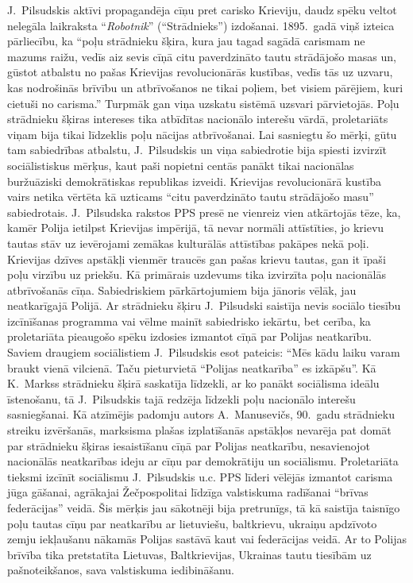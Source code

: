 \documentclass[twoside,a5paper,12pt,fleqn,openany]{extbook}
\newcommand{\pltxti}[1]{\textit{\textpolish{#1}}}
\begin{document}
J.~Pilsudskis aktīvi propagandēja cīņu pret carisko Krieviju, daudz spēku veltot nelegāla laikraksta ``\pltxti{Robotnik}'' (``Strādnieks'') izdošanai. 1895.~gadā viņš izteica pārliecību, ka ``poļu strādnieku šķira, kura jau tagad sagādā carismam ne mazums raižu, vedīs aiz sevis cīņā citu paverdzināto tautu strādājošo masas un, gūstot atbalstu no pašas Krievijas revolucionārās kustības, vedīs tās uz uzvaru, kas nodrošinās brīvību un atbrīvošanos ne tikai poļiem, bet visiem pārējiem, kuri cietuši no carisma.'' Turpmāk gan viņa uzskatu sistēmā uzsvari pārvietojās. Poļu strādnieku šķiras intereses tika atbīdītas nacionālo interešu vārdā, proletariāts viņam bija tikai līdzeklis poļu nācijas atbrīvošanai. Lai sasniegtu šo mērķi, gūtu tam sabiedrības atbalstu, J.~Pilsudskis un viņa sabiedrotie bija spiesti izvirzīt sociālistiskus mērķus, kaut paši nopietni centās panākt tikai nacionālas buržuāziski demokrātiskas republikas izveidi. Krievijas revolucionārā kustība vairs netika vērtēta kā uzticams ``citu paverdzināto tautu strādājošo masu'' sabiedrotais. J.~Pilsudska rakstos PPS presē ne vienreiz vien atkārtojās tēze, ka, kamēr Polija ietilpst Krievijas impērijā, tā nevar normāli attīstīties, jo krievu tautas stāv uz ievērojami zemākas kulturālās attīstības pakāpes nekā poļi. Krievijas dzīves apstākļi vienmēr traucēs gan pašas krievu tautas, gan it īpaši poļu virzību uz priekšu. Kā primārais uzdevums tika izvirzīta poļu nacionālās atbrīvošanās cīņa. Sabiedriskiem pārkārtojumiem bija jānoris vēlāk, jau neatkarīgajā Polijā. Ar strādnieku šķiru J.~Pilsudski saistīja nevis sociālo tiesību izcīnīšanas programma vai vēlme mainīt sabiedrisko iekārtu, bet cerība, ka proletariāta pieaugošo spēku izdosies izmantot cīņā par Polijas neatkarību. Saviem draugiem sociālistiem J.~Pilsudskis esot pateicis: ``Mēs kādu laiku varam braukt vienā vilcienā. Taču pieturvietā ``Polijas neatkarība'' es izkāpšu''. Kā K.~Markss strādnieku šķirā saskatīja līdzekli, ar ko panākt sociālisma ideālu īstenošanu, tā J.~Pilsudskis tajā redzēja līdzekli poļu nacionālo interešu sasniegšanai. Kā atzīmējis padomju autors A.~Manusevičs, 90.~gadu strādnieku streiku izvēršanās, marksisma plašas izplatīšanās apstākļos nevarēja pat domāt par strādnieku šķiras iesaistīšanu cīņā par Polijas neatkarību, nesavienojot nacionālās neatkarības ideju ar cīņu par demokrātiju un sociālismu. Proletariāta tieksmi izcīnīt sociālismu J.~Pilsudskis u.c. PPS līderi vēlējās izmantot carisma jūga gāšanai, agrākajai Žečpospolitai līdzīga valstiskuma radīšanai ``brīvas federācijas'' veidā. Šis mērķis jau sākotnēji bija pretrunīgs, tā kā saistīja taisnīgo poļu tautas cīņu par neatkarību ar lietuviešu, baltkrievu, ukraiņu apdzīvoto zemju iekļaušanu nākamās Polijas sastāvā kaut vai federācijas veidā. Ar to Polijas brīvība tika pretstatīta Lietuvas, Baltkrievijas, Ukrainas tautu tiesībām uz pašnoteikšanos, sava valstiskuma iedibināšanu.
\end{document}

